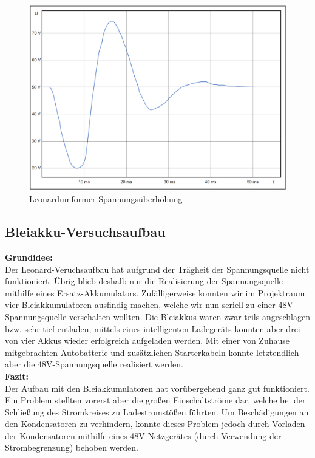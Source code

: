 \begin{figure}[H]
	\begin{center}
		\includegraphics[width=\textwidth]{figures/antrieb/Leonard_Spannungsueberschwingung.png}
		\caption{Leonardumformer Spannungsüberhöhung}
	\end{center}
\end{figure}


\newpage

\subsection{Bleiakku-Versuchsaufbau}

\textbf{Grundidee:}
\\[2mm]
Der Leonard-Veruchsaufbau hat aufgrund der Trägheit der Spannungsquelle nicht funktioniert. Übrig blieb deshalb nur die Realisierung der Spannungsquelle mithilfe eines Ersatz-Akkumulators. Zufälligerweise konnten wir im Projektraum vier Bleiakkumulatoren ausfindig machen, welche wir nun seriell zu einer 48V-Spannungsquelle verschalten wollten. Die Bleiakkus waren zwar teils angeschlagen bzw. sehr tief entladen, mittels eines intelligenten Ladegeräts konnten aber drei von vier Akkus wieder erfolgreich aufgeladen werden. Mit einer von Zuhause mitgebrachten Autobatterie und zusätzlichen Starterkabeln konnte letztendlich aber die 48V-Spannungsquelle realisiert werden.
\\[5mm]

\textbf{Fazit:}
\\[2mm]
Der Aufbau mit den Bleiakkumulatoren hat vorübergehend ganz gut funktioniert. Ein Problem stellten vorerst aber die großen Einschaltströme dar, welche bei der Schließung des Stromkreises zu Ladestromstößen führten. Um Beschädigungen an den Kondensatoren zu verhindern, konnte dieses Problem jedoch durch Vorladen der Kondensatoren mithilfe eines 48V Netzgerätes (durch Verwendung der Strombegrenzung) behoben werden.
\\[5mm]

